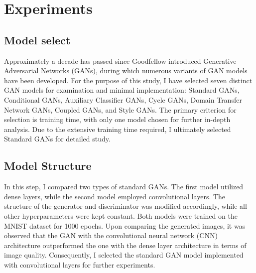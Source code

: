 \chapter{Experiments}
\label{Experiments}


\section*{Model select}
Approximately a decade has passed since Goodfellow introduced Generative Adversarial Networks (GANs), 
during which numerous variants of GAN models have been developed. For the purpose of this study, 
I have selected seven distinct GAN models for examination and minimal implementation: Standard GANs, 
Conditional GANs, Auxiliary Classifier GANs, Cycle GANs, Domain Transfer Network GANs, Coupled GANs, 
and Style GANs. The primary criterion for selection is training time, with only one model chosen for 
further in-depth analysis. Due to the extensive training time required, I ultimately selected Standard GANs for detailed study.


\section*{Model Structure}

In this step, I compared two types of standard GANs. The first model utilized dense layers, while the 
second model employed convolutional layers. The structure of the generator and discriminator was modified 
accordingly, while all other hyperparameters were kept constant. Both models were trained on the MNIST 
dataset for 1000 epochs. Upon comparing the generated images, it was observed that the GAN with the convolutional 
neural network (CNN) architecture outperformed the one with the dense layer architecture in terms of image quality. 
Consequently, I selected the standard GAN model implemented with convolutional layers for further experiments.

